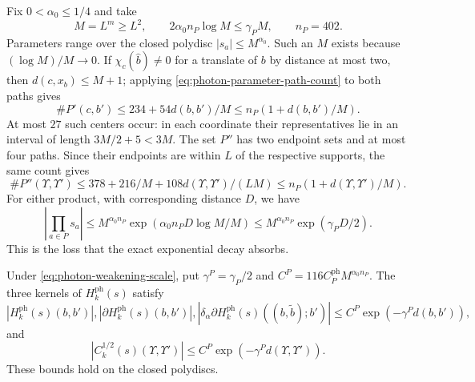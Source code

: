 \documentclass[11pt,letterpaper,reqno]{amsart}
\begin{document}
Fix $0<\alpha_0\le1/4$ and take
\begin{equation}\label{eq:photon-weakening-scale}
 M=L^m\ge L^2,\qquad
 2\alpha_0n_P\log M\le\gamma_PM,\qquad n_P=402.
\end{equation}
Parameters range over the closed polydisc $|s_a|\le M^{\alpha_0}$.
Such an $M$ exists because $(\log M)/M\to0$.
If $\chi_c(\hat b)\ne0$ for a translate of $b$ by distance at
most two, then $d(c,x_b)\le M+1$; applying
\eqref{eq:photon-parameter-path-count} to both paths gives
\[
 \#P'(c,b')\le234+54d(b,b')/M
                              \le n_P(1+d(b,b')/M).
\]
At most $27$ such centers occur: in each coordinate their
representatives lie in an interval of length $3M/2+5<3M$.
The set $P''$ has two endpoint sets and at most four paths.
Since their endpoints are within $L$ of the respective supports,
the same count gives
\[
 \#P''(\Upsilon,\Upsilon')
 \le378+216/M+108d(\Upsilon,\Upsilon')/(LM)
 \le n_P(1+d(\Upsilon,\Upsilon')/M).
\]
For either product, with corresponding distance $D$, we have
\begin{equation}\label{eq:photon-weakening-product-bound}
 \left|\prod_{a\in P}s_a\right|
 \le M^{\alpha_0n_P}\exp(\alpha_0n_P D\log M/M)
 \le M^{\alpha_0n_P}\exp(\gamma_PD/2).
\end{equation}
This is the loss that the exact exponential decay absorbs.

\begin{proposition}\label{prop:photon-weakened-bounds}
Under \eqref{eq:photon-weakening-scale}, put
$\gamma^P=\gamma_P/2$ and $C^P=116C_P^{\mathrm{ph}}M^{\alpha_0n_P}$.
The three kernels of $H_k^{\mathrm{ph}}(s)$ satisfy
\begin{equation}\label{eq:photon-weakened-regularity}
 |H_k^{\mathrm{ph}}(s)(b,b')|,
 |\partial H_k^{\mathrm{ph}}(s)(b,b')|,
 |\delta_\alpha\partial H_k^{\mathrm{ph}}(s)((b,\tilde b);b')|
                                  \le C^P\exp(-\gamma^Pd(b,b')),
\end{equation}
and
\begin{equation}\label{eq:photon-weakened-root-decay}
 |C_k^{1/2}(s)(\Upsilon,\Upsilon')|
                  \le C^P\exp(-\gamma^Pd(\Upsilon,\Upsilon')).
\end{equation}
These bounds hold on the closed polydiscs.
\end{proposition}
\end{document}
